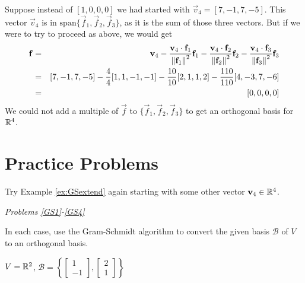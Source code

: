 \documentclass{ximera}
\begin{document}
\begin{remark}\label{rem:vectorInSpan}
Suppose instead of $[1,0,0,0]$ we had started with $\vec{v}_4 = [7, -1, 7, -5]$.  This vector $\vec{v}_4$ is in $\mbox{span}\{\vec{f}_1, \vec{f}_2, \vec{f}_3\}$, as it is the sum of those three vectors.  But if we were to try to proceed as above, we would get 
  \begin{eqnarray*}
      \mathbf{f} &=& \mathbf{v}_{4} - \frac{\mathbf{v}_{4} \cdot \mathbf{f}_{1}}{\left\lVert\mathbf{f}_{1}\right\rVert^2}\mathbf{f}_{1} - \frac{\mathbf{v}_{4} \cdot \mathbf{f}_{2}}{\left\lVert\mathbf{f}_{2}\right\rVert^2}\mathbf{f}_{2} - \frac{\mathbf{v}_{4} \cdot \mathbf{f}_{3}}{\left\lVert\mathbf{f}_{3}\right\rVert^2}\mathbf{f}_{3} \\
      &=& [7, -1, 7, -5] - \frac{4}{4}[1, 1, -1, -1] - \frac{10}{10}[2, 1, 1, 2] - \frac{110}{110}[4, -3, 7, -6] \\
      &=&[0,0,0,0]
  \end{eqnarray*}
We could not add a multiple of $\vec{f}$ to $\{\vec{f}_1, \vec{f}_2, \vec{f}_3\}$ to get an orthogonal basis for $\mathbb{R}^4$.
\end{remark}

\section*{Practice Problems}

\begin{problem}\label{prob:extend}

    Try Example \ref{ex:GSextend} again starting with some other vector $\mathbf{v}_4 \in \mathbb{R}^4$.

\end{problem}

\emph{Problems \ref{GS1}-\ref{GS4}}

In each case, use the Gram-Schmidt algorithm to convert the given basis $\mathcal{B}$ of $V$ to an orthogonal basis.  

\begin{problem}\label{GS1}
$V = \mathbb{R}^2$, $\mathcal{B} = \left\{\begin{bmatrix}1\\ -1\end{bmatrix}, \begin{bmatrix}2\\ 1\end{bmatrix}\right\}$

\end{problem}
\end{document}
